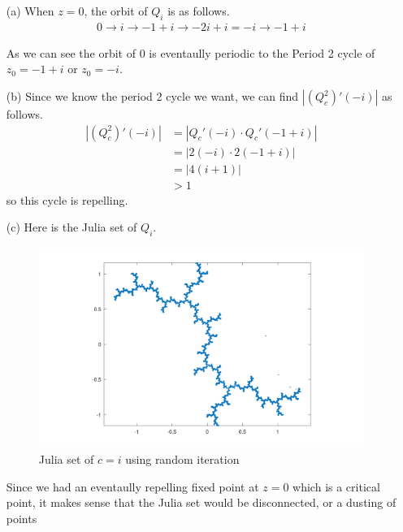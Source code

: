 \documentclass[12pt]{article}
\begin{document}
\begin{itemize}
	\item[(a)] When $z = 0$, the orbit of $Q_i$ is as follows.
		\begin{align*}
			0 \to i \to -1 + i \to -2i + i = -i \to -1 + i
		\end{align*}

		As we can see the orbit of 0 is eventaully periodic to the Period 2 cycle of $z_0 = -1 + i$ or $z_0 = -i$.
	\item[(b)] Since we know the period 2 cycle we want, we can find $|(Q_c^2)'(-i)|$ as follows.
		\begin{align*}
			|(Q_c^2)'(-i)| &= |Q_c'(-i) \cdot Q_c'(-1 + i)| \\
				     &= |2(-i)\cdot2(-1 + i)| \\
				     &= |4(i + 1)| \\
				     &> 1
		\end{align*}
		so this cycle is repelling.
	\item[(c)] Here is the Julia set of $Q_i$.
		\begin{figure}[ht]
			\begin{center}
				
			\includegraphics[scale=.35]{FigEX2.6c.png}
			\caption{Julia set of $c = i$ using random iteration}
			\end{center}
		\end{figure}
		Since we had an eventaully repelling fixed point at $z = 0$ which is a critical point, it makes sense that the Julia set would be disconnected, or a dusting of points
\end{itemize}
\end{document}
